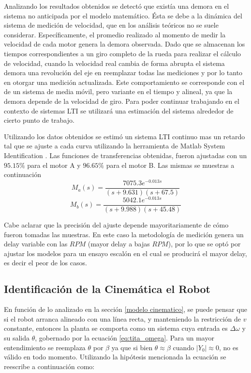 \documentclass[10pt,conference,a4paper,onecolumn]{article}%
\begin{document}
Analizando los resultados obtenidos se detectó que existía una demora en el sistema no anticipada por el modelo matemático. Ésta se debe a la dinámica del sistema de medición de velocidad, que en los análisis teóricos no se suele considerar. Específicamente, el promedio realizado al momento de medir la velocidad de cada motor genera la demora observada. Dado que se almacenan los tiempos correspondientes a un giro completo de la rueda  para realizar el cálculo de velocidad, cuando la velocidad real cambia de forma abrupta el sistema demora una revolución del eje en reemplazar todas las mediciones y por lo tanto en otorgar una medición actualizada. Este comportamiento se corresponde con el de un sistema de media móvil, pero variante en el tiempo y alineal, ya que la demora depende de la velocidad de giro. Para poder continuar trabajando en el contexto de sistemas LTI se utilizará una estimación del sistema alrededor de cierto punto de trabajo. 

Utilizando los datos obtenidos se estimó un sistema LTI continuo mas un retardo tal que se ajuste a cada curva utilizando la herramienta de Matlab System Identification \cite{Sys_ident}. Las funciones de transferencias obtenidas, fueron ajustadas con un $ 95.15\%$ para el motor A y $ 96.65\%$ para el motor B. Las mismas se muestras a continuación
\begin{equation}
M_a(s)= \frac{7075.3 e^{-0.013s}}{(s+9.631)(s+67.5)}
\end{equation}
\begin{equation}
M_b(s)= \frac{5042.1 e^{-0.013s}}{(s+9.988) (s+45.48)}
\end{equation}

Cabe aclarar que la precisión del ajuste depende mayoritariamente de cómo fueron tomadas las muestras. En este caso la metodología de medición genera un delay variable con las $RPM$ (mayor delay a bajas $RPM$), por lo que se optó por ajustar los modelos para un ensayo escalón en el cual se producirá el mayor delay, es decir el peor de los casos. 
\subsection{Identificación de la Cinemática el Robot}
En función de lo analizado en la sección \ref{modelo cinematico}, se puede pensar que si el robot arranca alineado con una línea recta, y manteniendo la restricción de $v$ constante, entonces la planta se comporta como un sistema cuya entrada es $\Delta \omega$ y su salida $\theta$, gobernado por la ecuación \ref{eq:tita_omega}. Para un mayor entendimiento se reemplaza $\theta$ por $\beta$ ya que si bien $\theta \approx \beta $ cuando $|Y_0| \approx 0$, no es válido en todo momento. Utilizando la hipótesis mencionada la ecuación se reescribe a continuación como:
\end{document}
